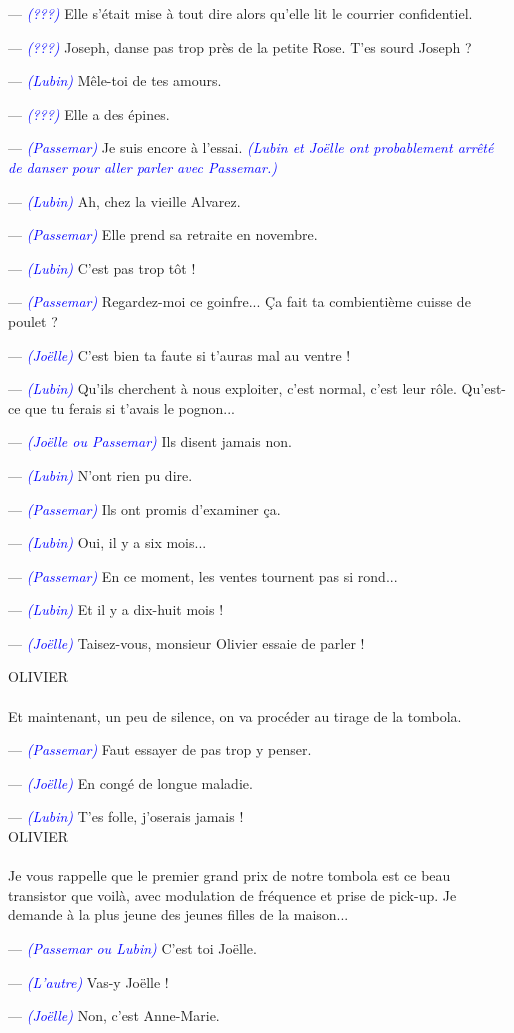 \documentclass[a4paper]{report}
\newcounter{rem}[chapter]
\newcommand{\annot}[1]{{\footnotesize \textcolor{blue}{\textit{(#1)}}}}
\newcommand{\repl}[2]{\uppercase{#1}\\\\#2\\}
\begin{document}
{--- \annot{???} Elle s'était mise à tout dire alors qu'elle lit le courrier confidentiel.

--- \annot{???} Joseph, danse pas trop près de la petite Rose. T'es sourd Joseph ?

--- \annot{Lubin} Mêle-toi de tes amours.

--- \annot{???} Elle a des épines.

--- \annot{Passemar} Je suis encore à l'essai. \annot{Lubin et Joëlle ont probablement arrêté de danser pour aller parler avec Passemar.}

--- \annot{Lubin} Ah, chez la vieille Alvarez.

--- \annot{Passemar} Elle prend sa retraite en novembre.

--- \annot{Lubin} C'est pas trop tôt !

--- \annot{Passemar} Regardez-moi ce goinfre... Ça fait ta combientième cuisse de poulet ?

--- \annot{Joëlle} C'est bien ta faute si t'auras mal au ventre !

--- \annot{Lubin} Qu'ils cherchent à nous exploiter, c'est normal, c'est leur rôle. Qu'est-ce que tu ferais si t'avais le pognon...

--- \annot{Joëlle ou Passemar} Ils disent jamais non.

--- \annot{Lubin} N'ont rien pu dire.

--- \annot{Passemar} Ils ont promis d'examiner ça.

--- \annot{Lubin} Oui, il y a six mois...

--- \annot{Passemar} En ce moment, les ventes tournent pas si rond...

--- \annot{Lubin} Et il y a dix-huit mois !

--- \annot{Joëlle} Taisez-vous, monsieur Olivier essaie de parler !}

\repl{Olivier}{Et maintenant, un peu de silence, on va procéder au tirage de la tombola.

--- \annot{Passemar} Faut essayer de pas trop y penser.

--- \annot{Joëlle} En congé de longue maladie.

--- \annot{Lubin} T'es folle, j'oserais jamais !}

\repl{Olivier}{Je vous rappelle que le premier grand prix de notre tombola est ce beau transistor que voilà, avec modulation de fréquence et prise de pick-up. Je demande à la plus jeune des jeunes filles de la maison...

--- \annot{Passemar ou Lubin} C'est toi Joëlle.

--- \annot{L'autre} Vas-y Joëlle !

--- \annot{Joëlle} Non, c'est Anne-Marie.}
\end{document}
